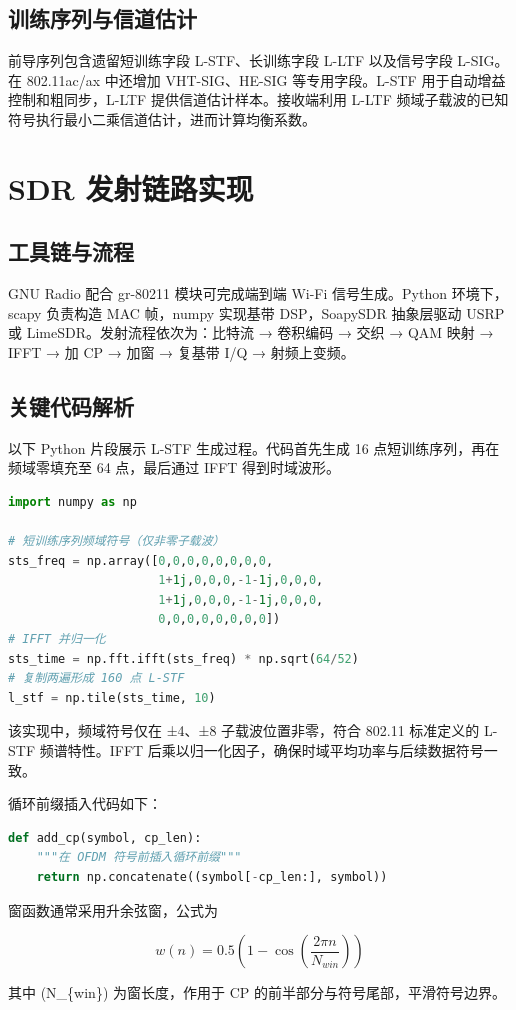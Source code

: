 \section{训练序列与信道估计}
前导序列包含遗留短训练字段 L-STF、长训练字段 L-LTF 以及信号字段 L-SIG。在 802.11ac/ax 中还增加 VHT-SIG、HE-SIG 等专用字段。L-STF 用于自动增益控制和粗同步，L-LTF 提供信道估计样本。接收端利用 L-LTF 频域子载波的已知符号执行最小二乘信道估计，进而计算均衡系数。\par
\chapter{SDR 发射链路实现}
\section{工具链与流程}
GNU Radio 配合 gr-80211 模块可完成端到端 Wi-Fi 信号生成。Python 环境下，scapy 负责构造 MAC 帧，numpy 实现基带 DSP，SoapySDR 抽象层驱动 USRP 或 LimeSDR。发射流程依次为：比特流 → 卷积编码 → 交织 → QAM 映射 → IFFT → 加 CP → 加窗 → 复基带 I/Q → 射频上变频。\par
\section{关键代码解析}
以下 Python 片段展示 L-STF 生成过程。代码首先生成 16 点短训练序列，再在频域零填充至 64 点，最后通过 IFFT 得到时域波形。\par
\begin{lstlisting}[language=python]
import numpy as np

# 短训练序列频域符号（仅非零子载波）
sts_freq = np.array([0,0,0,0,0,0,0,0,
                     1+1j,0,0,0,-1-1j,0,0,0,
                     1+1j,0,0,0,-1-1j,0,0,0,
                     0,0,0,0,0,0,0,0])
# IFFT 并归一化
sts_time = np.fft.ifft(sts_freq) * np.sqrt(64/52)
# 复制两遍形成 160 点 L-STF
l_stf = np.tile(sts_time, 10)
\end{lstlisting}
该实现中，频域符号仅在 ±4、±8 子载波位置非零，符合 802.11 标准定义的 L-STF 频谱特性。IFFT 后乘以归一化因子，确保时域平均功率与后续数据符号一致。\par
循环前缀插入代码如下：\par
\begin{lstlisting}[language=python]
def add_cp(symbol, cp_len):
    """在 OFDM 符号前插入循环前缀"""
    return np.concatenate((symbol[-cp_len:], symbol))
\end{lstlisting}
窗函数通常采用升余弦窗，公式为\par
$$ w(n) = 0.5 \left(1 - \cos\left(\frac{2\pi n}{N_{win}}\right)\right) $$\par
其中 (N\_{}\{{}win\}{}) 为窗长度，作用于 CP 的前半部分与符号尾部，平滑符号边界。\par
